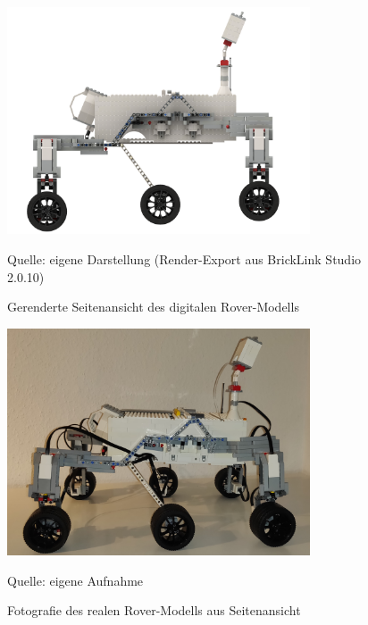 \begin{figure}
	\centering
	\includegraphics[width=0.8\textwidth]{../Images/20200429_Mars_Rover_V5_side.png}
	\vspace{0.5em}
	\parbox[c]{0.8\linewidth}{\footnotesize
		\centering
		\vspace{1em}
		Quelle: eigene Darstellung (Render-Export aus BrickLink Studio 2.0.10)
	}
	\caption{Gerenderte Seitenansicht des digitalen Rover-Modells}
	\label{fig:roversiderender}
\end{figure}

\begin{figure}
	\centering
	\includegraphics[width=0.8\textwidth]{../Images/20200429_side_01.jpg}
	\vspace{0.5em}
	\parbox[c]{0.8\linewidth}{\footnotesize
		\centering
		\vspace{1em}
		Quelle: eigene Aufnahme
	}
	\caption{Fotografie des realen Rover-Modells aus Seitenansicht}
	\label{fig:roversidefoto}
\end{figure}

